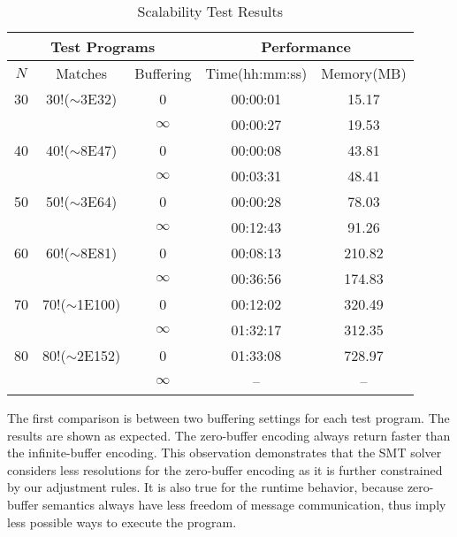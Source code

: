 \begin{table}[t]
\begin{center}
\scriptsize
\caption{Scalability Test Results}\label{table:scalability}
\begin{tabular}{|c|c|c|c|c|}
		\hline
         \multicolumn{3}{|c|}{Test Programs} & \multicolumn{2}{|c|}{Performance} \\ \hline
          $\mathit{N}$ & Matches & Buffering  & Time(hh:mm:ss) & Memory(MB) \\ \hline
          30 & 30!($\sim$3E32) & 0 & 00:00:01 & 15.17\\
               & & $\infty$ & 00:00:27 & 19.53 \\ \hline
          40 & 40!($\sim$8E47) & 0 & 00:00:08 & 43.81\\
               &  & $\infty$ & 00:03:31 & 48.41 \\ \hline
          50 & 50!($\sim$3E64) & 0 & 00:00:28 & 78.03\\
               & & $\infty$ & 00:12:43 & 91.26\\ \hline
          60 & 60!($\sim$8E81) & 0 & 00:08:13 & 210.82\\
               &  & $\infty$ & 00:36:56 & 174.83\\ \hline
          70 & 70!($\sim$1E100) & 0 & 00:12:02 & 320.49\\
               & & $\infty$ & 01:32:17 & 312.35\\ \hline
          80 & 80!($\sim$2E152) & 0 & 01:33:08 & 728.97\\
               & & $\infty$ & -- & --\\ \hline         
		\end{tabular}
\end{center}
\end{table}
The first comparison is between two buffering settings for each test program. The results are shown as expected. The zero-buffer encoding always return faster than the infinite-buffer encoding. This observation demonstrates that the SMT solver considers less resolutions for the zero-buffer encoding as it is further constrained by our adjustment rules. It is also true for the runtime behavior, because zero-buffer semantics always have less freedom of message communication, thus imply less possible ways to execute the program. 

